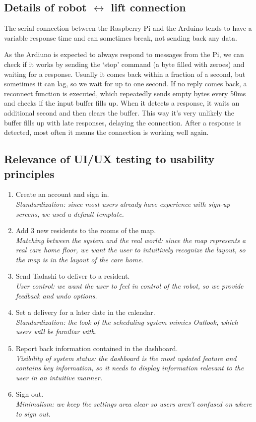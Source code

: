 \documentclass{article}
\begin{document}
\subsection{Details of robot $\leftrightarrow$ lift connection}
\label{connection}
The serial connection between the Raspberry Pi and the Arduino tends to have a variable response time and can sometimes break, not sending back any data.

As the Ardiuno is expected to always respond to messages from the Pi, we can check if it works by sending the `stop' command (a byte filled with zeroes) and waiting for a response. Usually it comes back within a fraction of a second, but sometimes it can lag, so we wait for up to one second. If no reply comes back, a reconnect function is executed, which repeatedly sends empty bytes every 50ms and checks if the input buffer fills up. When it detects a response, it waits an additional second and then clears the buffer. This way it's very unlikely the buffer fills up with late responses, delaying the connection. After a response is detected, most often it means the connection is working well again.

\subsection{Relevance of UI/UX testing to usability principles}
\label{usability}
\begin{enumerate}
  \item Create an account and sign in. \\{\it Standardization: since most users already have experience with sign-up screens, we used a default template.}
  \item Add 3 new residents to the rooms of the map. \\{\it Matching between the system and the real world: since the map represents a real care home floor, we want the user to intuitively recognize the layout, so the map is in the layout of the care home.}
  \item Send Tadashi to deliver to a resident. \\{\it User control: we want the user to feel in control of the robot, so we provide feedback and undo options.}
  \item Set a delivery for a later date in the calendar. \\{\it Standardization: the look of the scheduling system mimics Outlook, which users will be familiar with.}
  \item Report back information contained in the dashboard. \\{\it Visibility of system status: the dashboard is the most updated feature and contains key information, so it needs to display information relevant to the user in an intuitive manner.}
  \item Sign out. \\{\it Minimalism: we keep the settings area clear so users aren't confused on where to sign out.}
\end{enumerate}
\end{document}
